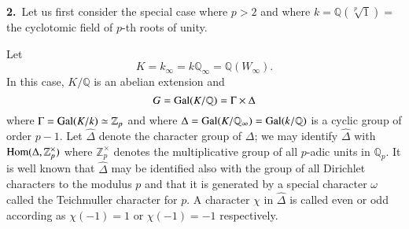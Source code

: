 \smallskip
{\bf 2.}~Let us first consider the special case where $p>2$ and where $k=\mathbb{Q}(\sqrt[p]{1})=$ the cyclotomic field of $p$-th roots of unity.

Let
$$
K=k_{\infty}=k\mathbb{Q}_{\infty}=\mathbb{Q}(W_{\infty}).
$$
In this case, $K/\mathbb{Q}$ is an abelian extension and
$$
G=\operatorname{Gal}(K/\mathbb{Q})=\Gamma\times \Delta
$$
where $\Gamma=\operatorname{Gal}(K/k)\simeq \mathbb{Z}_{p}$  and where $\Delta=\operatorname{Gal}(K/\mathbb{Q}_{\infty})=\operatorname{Gal}(k/\mathbb{Q})$ is a cyclic group of order $p-1$. Let $\widehat{\Delta}$ denote the character group of $\Delta$; we may identify $\widehat{\Delta}$ with $\operatorname{Hom}(\Delta,\mathbb{Z}^{\times}_{p})$ where $\mathbb{Z}^{\times}_{p}$ denotes the multiplicative group of all $p$-adic units in $\mathbb{Q}_{p}$. It is well known that $\widehat{\Delta}$ may be identified also with the group of all Dirichlet characters to the modulus $p$ and that it is generated by a special character $\omega$ called the Teichmuller character for $p$. A character $\chi$ in $\widehat{\Delta}$ is called even or odd according as $\chi(-1)=1$ or $\chi(-1)=-1$ respectively.

